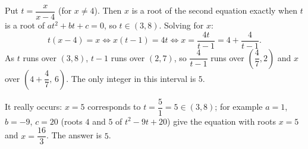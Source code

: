 Put $t=\dfrac{x}{x-4}$ (for $x\ne4$). Then $x$ is a root of the second equation exactly when $t$ is a root of $at^2+bt+c=0$, so $t\in(3,8)$. Solving for $x$:
\[
t(x-4)=x\iff x(t-1)=4t\iff x=\dfrac{4t}{t-1}=4+\dfrac{4}{t-1}.
\]
As $t$ runs over $(3,8)$, $t-1$ runs over $(2,7)$, so $\dfrac{4}{t-1}$ runs over $\left(\dfrac{4}{7},2\right)$ and $x$ over $\left(4+\dfrac{4}{7},\,6\right)$. The only integer in this interval is $5$.

It really occurs: $x=5$ corresponds to $t=\dfrac{5}{1}=5\in(3,8)$; for example $a=1$, $b=-9$, $c=20$ (roots $4$ and $5$ of $t^2-9t+20$) give the equation with roots $x=5$ and $x=\dfrac{16}{3}$. The answer is $\boxed{5}$.
